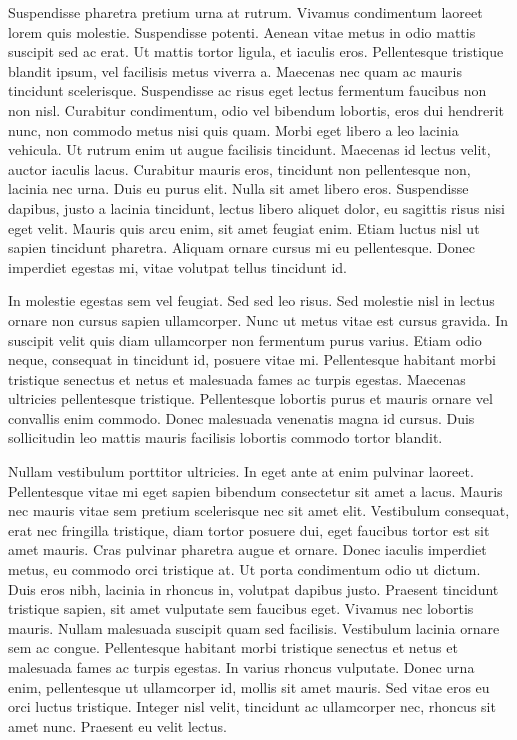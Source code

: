 Suspendisse pharetra pretium urna at rutrum. Vivamus condimentum laoreet lorem quis molestie. Suspendisse potenti. Aenean vitae metus in odio mattis suscipit sed ac erat. Ut mattis tortor ligula, et iaculis eros. Pellentesque tristique blandit ipsum, vel facilisis metus viverra a. Maecenas nec quam ac mauris tincidunt scelerisque. Suspendisse ac risus eget lectus fermentum faucibus non non nisl. Curabitur condimentum, odio vel bibendum lobortis, eros dui hendrerit nunc, non commodo metus nisi quis quam. Morbi eget libero a leo lacinia vehicula. Ut rutrum enim ut augue facilisis tincidunt. Maecenas id lectus velit, auctor iaculis lacus. Curabitur mauris eros, tincidunt non pellentesque non, lacinia nec urna. Duis eu purus elit. Nulla sit amet libero eros. Suspendisse dapibus, justo a lacinia tincidunt, lectus libero aliquet dolor, eu sagittis risus nisi eget velit. Mauris quis arcu enim, sit amet feugiat enim. Etiam luctus nisl ut sapien tincidunt pharetra. Aliquam ornare cursus mi eu pellentesque. Donec imperdiet egestas mi, vitae volutpat tellus tincidunt id.

In molestie egestas sem vel feugiat. Sed sed leo risus. Sed molestie nisl in lectus ornare non cursus sapien ullamcorper. Nunc ut metus vitae est cursus gravida. In suscipit velit quis diam ullamcorper non fermentum purus varius. Etiam odio neque, consequat in tincidunt id, posuere vitae mi. Pellentesque habitant morbi tristique senectus et netus et malesuada fames ac turpis egestas. Maecenas ultricies pellentesque tristique. Pellentesque lobortis purus et mauris ornare vel convallis enim commodo. Donec malesuada venenatis magna id cursus. Duis sollicitudin leo mattis mauris facilisis lobortis commodo tortor blandit.

Nullam vestibulum porttitor ultricies. In eget ante at enim pulvinar laoreet. Pellentesque vitae mi eget sapien bibendum consectetur sit amet a lacus. Mauris nec mauris vitae sem pretium scelerisque nec sit amet elit. Vestibulum consequat, erat nec fringilla tristique, diam tortor posuere dui, eget faucibus tortor est sit amet mauris. Cras pulvinar pharetra augue et ornare. Donec iaculis imperdiet metus, eu commodo orci tristique at. Ut porta condimentum odio ut dictum. Duis eros nibh, lacinia in rhoncus in, volutpat dapibus justo. Praesent tincidunt tristique sapien, sit amet vulputate sem faucibus eget. Vivamus nec lobortis mauris. Nullam malesuada suscipit quam sed facilisis. Vestibulum lacinia ornare sem ac congue. Pellentesque habitant morbi tristique senectus et netus et malesuada fames ac turpis egestas. In varius rhoncus vulputate. Donec urna enim, pellentesque ut ullamcorper id, mollis sit amet mauris. Sed vitae eros eu orci luctus tristique. Integer nisl velit, tincidunt ac ullamcorper nec, rhoncus sit amet nunc. Praesent eu velit lectus.

